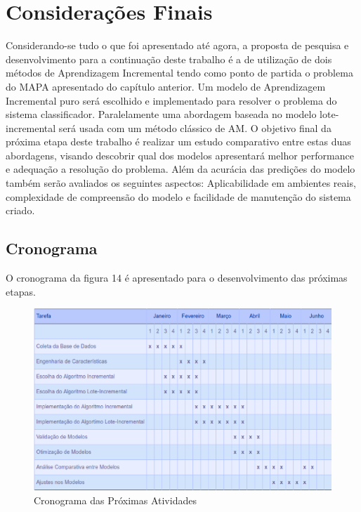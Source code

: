 \chapter{Considerações Finais}

Considerando-se tudo o que foi apresentado até agora, a proposta de pesquisa e desenvolvimento para a continuação deste trabalho é a de utilização de dois métodos de Aprendizagem Incremental tendo como ponto de partida o problema do MAPA apresentado do capítulo anterior. Um modelo de Aprendizagem Incremental puro será escolhido e implementado para resolver o problema do sistema classificador. Paralelamente uma abordagem baseada no modelo lote-incremental será usada com um método clássico de AM. O objetivo final da próxima etapa deste trabalho é realizar um estudo comparativo entre estas duas abordagens, visando descobrir qual dos modelos apresentará melhor performance e adequação a resolução do problema. Além da acurácia das predições do modelo também serão avaliados os seguintes aspectos: Aplicabilidade em ambientes reais, complexidade de compreensão do modelo e facilidade de manutenção do sistema criado.

\section{Cronograma}
O cronograma da figura 14 é apresentado para o desenvolvimento das próximas etapas. 

\begin{figure}[!h]
\centering
\includegraphics[keepaspectratio=true,scale=0.50]
{figuras/cronograma.eps}
\caption{Cronograma das Próximas Atividades}
\label{cronograma}
\end{figure}

